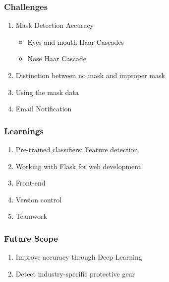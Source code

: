 \documentclass[14pt]{beamer}
\begin{document}

\begin{frame}
    \frametitle{Challenges}
    \begin{enumerate}
        \item Mask Detection Accuracy
            \begin{itemize}
            \item Eyes and mouth Haar Cascades
            \item Nose Haar Cascade
            \end{itemize}
        \item Distinction between no mask and improper mask
        \item Using the mask data
        \item Email Notification 
    \end{enumerate}
\end{frame}


\begin{frame}
    \frametitle{Learnings}
    \begin{enumerate}
        \item Pre-trained classifiers: Feature detection
        \item Working with Flask for web development
        \item Front-end
        \item Version control  
        \item Teamwork
    \end{enumerate}
\end{frame}

\begin{frame}
    \frametitle{Future Scope}
    \begin{enumerate}
        \item Improve accuracy through Deep Learning
        \item Detect industry-specific protective gear
    \end{enumerate}
\end{frame}
\end{document}
